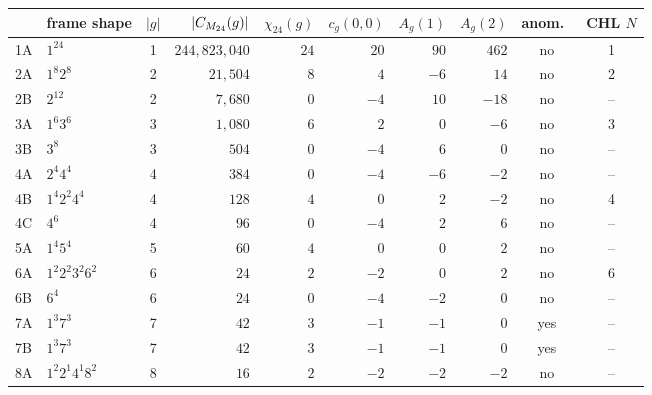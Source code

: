 {\footnotesize
\begin{center}
\begin{tabular}{l|l|c|r|r|r|r|r|c|c}
\toprule
 [g] & frame shape & $|g|$ & $|C_{M_{24}}(g)|$ &
   $\chi_{24}(g)$ & $c_g(0,0)$ &
   $A_g(1)$ & $A_g(2)$ & anom.\ & CHL $N$ \\
\midrule
 1A  & $1^{24}$                       & 1  & $244{,}823{,}040$ & $24$ & $20$ & $\phantom{-}90$ & $\phantom{-}462$ & no  & 1 \\
 2A  & $1^{8}2^{8}$                   & 2  & $21{,}504$        & $\phantom{0}8$ & $\phantom{-}4$  & $-6$ & $\phantom{-}14$  & no  & 2 \\
 2B  & $2^{12}$                       & 2  & $7{,}680$         & $\phantom{0}0$ & $-4$ & $\phantom{-}10$ & $-18$ & no  & -- \\
 3A  & $1^{6}3^{6}$                   & 3  & $1{,}080$         & $\phantom{0}6$ & $\phantom{-}2$  & $\phantom{-}0$  & $-6$  & no  & 3 \\
 3B  & $3^{8}$                        & 3  & $504$             & $\phantom{0}0$ & $-4$ & $\phantom{-}6$  & $\phantom{-}0$  & no  & -- \\
 4A  & $2^{4}4^{4}$                   & 4  & $384$             & $\phantom{0}0$ & $-4$ & $-6$ & $-2$ & no  & -- \\
 4B  & $1^{4}2^{2}4^{4}$              & 4  & $128$             & $\phantom{0}4$ & $\phantom{-}0$  & $\phantom{-}2$  & $-2$ & no  & 4 \\
 4C  & $4^{6}$                        & 4  & $96$              & $\phantom{0}0$ & $-4$ & $\phantom{-}2$  & $\phantom{-}6$  & no  & -- \\
 5A  & $1^{4}5^{4}$                   & 5  & $60$              & $\phantom{0}4$ & $\phantom{-}0$  & $\phantom{-}0$  & $\phantom{-}2$  & no  & -- \\
 6A  & $1^{2}2^{2}3^{2}6^{2}$         & 6  & $24$              & $\phantom{0}2$ & $-2$ & $\phantom{-}0$  & $\phantom{-}2$  & no  & 6 \\
 6B  & $6^{4}$                        & 6  & $24$              & $\phantom{0}0$ & $-4$ & $-2$ & $\phantom{-}0$  & no  & -- \\
 7A  & $1^{3}7^{3}$                   & 7  & $42$              & $\phantom{0}3$ & $-1$ & $-1$ & $\phantom{-}0$  & yes & -- \\
 7B  & $1^{3}7^{3}$                   & 7  & $42$              & $\phantom{0}3$ & $-1$ & $-1$ & $\phantom{-}0$  & yes & -- \\
 8A  & $1^{2}2^{1}4^{1}8^{2}$         & 8  & $16$              & $\phantom{0}2$ & $-2$ & $-2$ & $-2$ & no  & -- \\

\end{tabular}
\end{center}}
